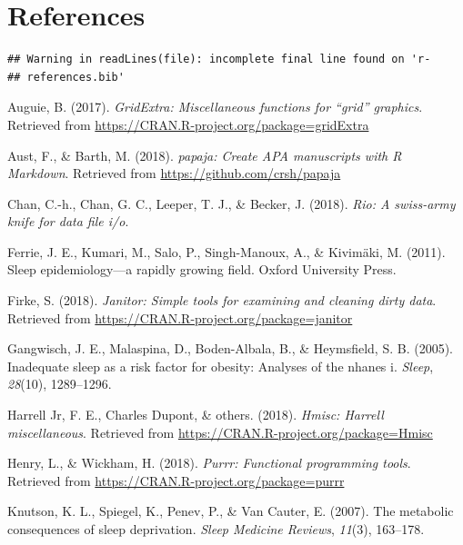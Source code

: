 \documentclass[man]{apa6}
\theoremstyle{definition}
\theoremstyle{definition}
\theoremstyle{definition}
\theoremstyle{remark}
\begin{document}
\section{References}\label{references}

\begin{verbatim}
## Warning in readLines(file): incomplete final line found on 'r-
## references.bib'
\end{verbatim}

\begingroup
\setlength{\parindent}{-0.5in} \setlength{\leftskip}{0.5in}

\hypertarget{refs}{}
\hypertarget{ref-R-gridExtra}{}
Auguie, B. (2017). \emph{GridExtra: Miscellaneous functions for ``grid''
graphics}. Retrieved from
\url{https://CRAN.R-project.org/package=gridExtra}

\hypertarget{ref-R-papaja}{}
Aust, F., \& Barth, M. (2018). \emph{papaja: Create APA manuscripts with
R Markdown}. Retrieved from \url{https://github.com/crsh/papaja}

\hypertarget{ref-R-rio}{}
Chan, C.-h., Chan, G. C., Leeper, T. J., \& Becker, J. (2018).
\emph{Rio: A swiss-army knife for data file i/o}.

\hypertarget{ref-ferrie2011sleep}{}
Ferrie, J. E., Kumari, M., Salo, P., Singh-Manoux, A., \& Kivimäki, M.
(2011). Sleep epidemiology---a rapidly growing field. Oxford University
Press.

\hypertarget{ref-R-janitor}{}
Firke, S. (2018). \emph{Janitor: Simple tools for examining and cleaning
dirty data}. Retrieved from
\url{https://CRAN.R-project.org/package=janitor}

\hypertarget{ref-gangwisch2005inadequate}{}
Gangwisch, J. E., Malaspina, D., Boden-Albala, B., \& Heymsfield, S. B.
(2005). Inadequate sleep as a risk factor for obesity: Analyses of the
nhanes i. \emph{Sleep}, \emph{28}(10), 1289--1296.

\hypertarget{ref-R-Hmisc}{}
Harrell Jr, F. E., Charles Dupont, \& others. (2018). \emph{Hmisc:
Harrell miscellaneous}. Retrieved from
\url{https://CRAN.R-project.org/package=Hmisc}

\hypertarget{ref-R-purrr}{}
Henry, L., \& Wickham, H. (2018). \emph{Purrr: Functional programming
tools}. Retrieved from \url{https://CRAN.R-project.org/package=purrr}

\hypertarget{ref-knutson2007metabolic}{}
Knutson, K. L., Spiegel, K., Penev, P., \& Van Cauter, E. (2007). The
metabolic consequences of sleep deprivation. \emph{Sleep Medicine
Reviews}, \emph{11}(3), 163--178.
\end{document}
